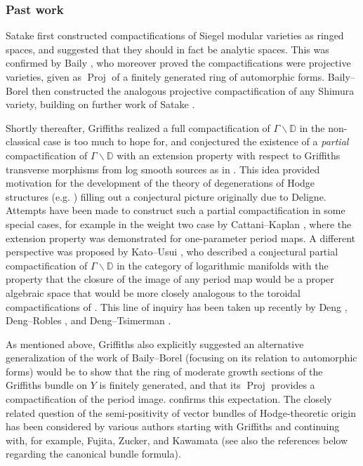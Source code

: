 \documentclass{amsart}
\newcommand{\bs}{\backslash}
\newcommand{\proj}{\operatorname{Proj}}
\theoremstyle{definition}
\theoremstyle{remark}
\def\bD{\mathbb{D}}
\numberwithin{equation}{section}
\begin{document}
\subsubsection{Past work}
Satake \cite{satake} first constructed compactifications of Siegel modular varieties as ringed spaces, and suggested that they should in fact be analytic spaces.  This was confirmed by Baily \cite{baily}, who moreover proved the compactifications were projective varieties, given as $\proj$ of a finitely generated ring of automorphic forms.  Baily--Borel \cite{BB66} then constructed the analogous projective compactification of any Shimura variety, building on further work of Satake \cite{satake2,satake3}.

Shortly thereafter, Griffiths \cite[\S9]{G70Summary} realized a full compactification of $\Gamma\bs\bD$ in the non-classical case is too much to hope for, and conjectured the existence of a \emph{partial} compactification of $\Gamma\bs \bD$ with an extension property with respect to Griffiths transverse morphisms from log smooth sources as in .  This idea provided motivation for the development of the theory of degenerations of Hodge structures (e.g. \cite{Schmid,steenbrinklimit,kashiwara,cks}) filling out a conjectural picture originally due to Deligne.  Attempts have been made to construct such a partial compactification in some special cases, for example in the weight two case by Cattani--Kaplan \cite{CKextend}, where the extension property was demonstrated for one-parameter period maps.  A different perspective was proposed by Kato--Usui \cite{katousui}, who described a conjectural partial compactification of $\Gamma\bs\bD$ in the category of logarithmic manifolds with the property that the closure of the image of any period map would be a proper algebraic space \cite{usuiextend} that would be more closely analogous to the toroidal compactifications of \cite{amrt}.  This line of inquiry has been taken up recently by Deng \cite{deng2021extensionperiodmapspolyhedral,deng2025generalizedtoroidalcompletionperiod}, Deng--Robles \cite{deng2023completiontwoparameterperiodmaps}, and Deng--Tsimerman \cite{deng2025generalizedtoroidalcompletionperiod}.

As mentioned above, Griffiths \cite[(10.7) Remark]{G70Summary} also explicitly suggested an alternative generalization of the work of Baily--Borel (focusing on its relation to automorphic forms) would be to show that the ring of moderate growth sections of the Griffiths bundle on $Y$ is finitely generated, and that its $\proj$ provides a compactification of the period image.   confirms this expectation.  The closely related question of the semi-positivity of vector bundles of Hodge-theoretic origin has been considered by various authors starting with Griffiths \cite{G70III} and continuing with, for example, Fujita, Zucker, and Kawamata \cite{fujitasemi,zuckersemi,kawamatasemi} (see also the references below regarding the canonical bundle formula).  
\end{document}
